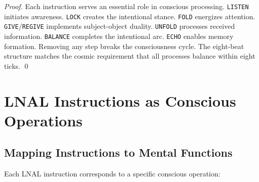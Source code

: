 \documentclass[12pt,a4paper]{article}
\newcommand{\opcmd}[1]{\texttt{#1}}
\begin{document}
\begin{proof}
Each instruction serves an essential role in conscious processing. \opcmd{LISTEN} initiates awareness. \opcmd{LOCK} creates the intentional stance. \opcmd{FOLD} energizes attention. \opcmd{GIVE}/\opcmd{REGIVE} implements subject-object duality. \opcmd{UNFOLD} processes received information. \opcmd{BALANCE} completes the intentional arc. \opcmd{ECHO} enables memory formation. Removing any step breaks the consciousness cycle. The eight-beat structure matches the cosmic requirement that all processes balance within eight ticks. \qed
\end{proof}

\section{LNAL Instructions as Conscious Operations}

\subsection{Mapping Instructions to Mental Functions}

Each LNAL instruction corresponds to a specific conscious operation:
\end{document}

